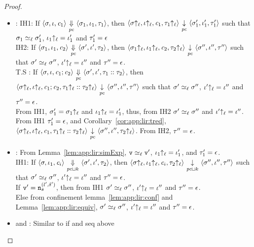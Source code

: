 \begin{proof}
\begin{itemize}[leftmargin=.5in]
  \item {}: IH1: If $\langle \sigma, \iota, \mathit{c}_1 \rangle
    {~\underset{\mathit{pc}}{\Downarrow}~} \langle \sigma_1, \iota_1, \tau_1 \rangle$,
    then $\langle \sigma{\uparrow_\ell}, \iota{\uparrow_\ell}, \mathit{c}_1, \tau_1{\uparrow_\ell}
    \rangle  {~\underset{\mathit{pc}}{\downarrow}~} \langle \sigma_1',\iota_1',
    \tau_1' \rangle$ such that $\sigma_1 \simeq_\ell \sigma_1'$,
    $\iota_1{\uparrow_\ell} = \iota_1'$ and $\tau_1' = \epsilon$ \\
    IH2: If $\langle \sigma_1, \iota_1, \mathit{c}_2 \rangle
    {~\underset{\mathit{pc}}{\Downarrow}~} \langle \sigma', \iota', \tau_2 \rangle$,
    then $\langle \sigma_1{\uparrow_\ell}, \iota_1{\uparrow_\ell}, \mathit{c}_2, \tau_2{\uparrow_\ell} 
    \rangle  {~\underset{\mathit{pc}}{\downarrow}~} \langle \sigma'',\iota'',
    \tau'' \rangle$ such that $\sigma' \simeq_\ell \sigma''$,
    $\iota'{\uparrow_\ell} = \iota''$ and $\tau'' = \epsilon$.\\
    T.S : If $\langle \sigma, \iota, \mathit{c}_1;\mathit{c}_2 \rangle
    {~\underset{\mathit{pc}}{\Downarrow}~} \langle \sigma', \iota', \tau_1::\tau_2 \rangle$,
    then \\ $\langle \sigma{\uparrow_\ell}, \iota{\uparrow_\ell}, \mathit{c}_1;\mathit{c}_2,
    \tau_1{\uparrow_\ell}::\tau_2{\uparrow_\ell} 
    \rangle  {~\underset{\mathit{pc}}{\downarrow}~} \langle \sigma'',\iota'',
    \tau'' \rangle$ such that $\sigma' \simeq_\ell \sigma''$,
    $\iota'{\uparrow_\ell} = \iota''$ and $\tau'' = \epsilon$. \\
    From IH1, $\sigma_1' = \sigma_1{\uparrow_\ell}$ and $\iota_1{\uparrow_\ell} = \iota_1'$,
    thus, from IH2 $\sigma' \simeq_\ell \sigma''$ and $\iota'{\uparrow_\ell} =
    \iota''$. \\
    From IH1 $\tau_1' = \epsilon$, and Corollary~\ref{cor:app:lir:tred},
    $\langle 
    \sigma{\uparrow_\ell}, \iota{\uparrow_\ell}, \mathit{c}_1, \tau_1{\uparrow_\ell}::\tau_2{\uparrow_\ell} 
    \rangle  {~\underset{\mathit{pc}}{\downarrow}~} \langle \sigma'',\iota'',
    \tau_2{\uparrow_\ell} \rangle$. From IH2, $\tau'' = \epsilon$.

  \item {}: From Lemma~\ref{lem:app:lir:simExp},
    $\texttt{v} \simeq_\ell \texttt{v}'$, 
    $\iota_1{\uparrow_\ell} = \iota_1'$, and $\tau_1' = \epsilon$. \\
    IH1: If $\langle \sigma, \iota_1, \mathit{c}_i \rangle
    {~\underset{\mathit{pc}\sqcup k}{\Downarrow}~} \langle \sigma', \iota', \tau_2 \rangle$,
    then $\langle \sigma{\uparrow_\ell}, \iota_1{\uparrow_\ell}, \mathit{c}_i, \tau_2{\uparrow_\ell}
    \rangle  {~\underset{\mathit{pc}\sqcup k}{\downarrow}~} \langle \sigma'',\iota'',
    \tau'' \rangle$ such that $\sigma' \simeq_\ell \sigma''$,
    $\iota'{\uparrow_\ell} = \iota''$ and $\tau'' = \epsilon$. \\
    If $\texttt{v}' = \texttt{n}_s^{(l', \delta')}$, then from IH1 $\sigma'
    \simeq_\ell \sigma''$, 
    $\iota'{\uparrow_\ell} = \iota''$ and $\tau'' = \epsilon$. \\ 
    Else from confinement lemma~\ref{lem:app:lir:conf} and
    Lemma~\ref{lem:app:lir:equiv}, $\sigma' 
    \simeq_\ell \sigma''$, 
    $\iota'{\uparrow_\ell} = \iota''$ and $\tau'' = \epsilon$.

  \item {} and : Similar to if and seq above
  \end{itemize}
\end{proof}


